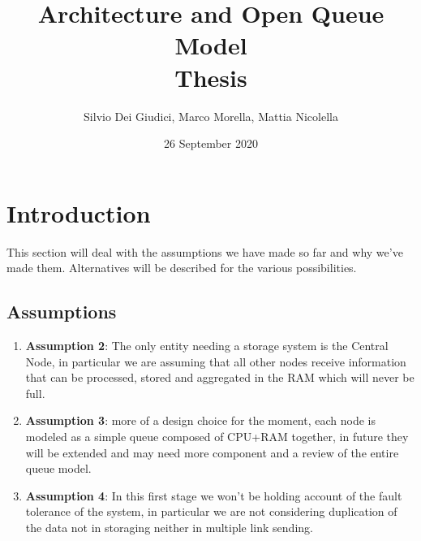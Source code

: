 \documentclass[11pt]{article}
\title {Architecture and Open Queue Model \\ \bigskip \large Thesis}
\author {Silvio Dei Giudici, Marco Morella, Mattia Nicolella}
\date{26 September 2020}
\begin{document}
\maketitle
\section{Introduction}
This section will deal with the assumptions we have made so far and why we've made them. Alternatives will be described for the various possibilities.\\
\subsection{Assumptions}
\begin{enumerate}
\item \textbf{Assumption 2}: The only entity needing a storage system is the Central Node, in particular we are assuming that all other nodes receive information that can be processed, stored and aggregated in the RAM which will never be full.
\item \textbf{Assumption 3}: more of a design choice for the moment, each node is modeled as a simple queue composed of CPU+RAM together, in future they will be extended and may need more component and a review of the entire queue model.
\item \textbf{Assumption 4}: In this first stage we won't be holding account of the fault tolerance of the system, in particular we are not considering duplication of the data not in storaging neither in multiple link sending.
\end{enumerate}
\end{document}

